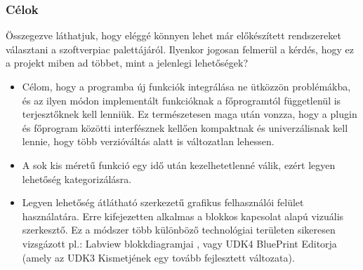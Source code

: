 \documentclass[a4paper,12pt,oneside]{report}
\begin{document}
\subsubsection{Célok}
Összegezve láthatjuk, hogy eléggé könnyen lehet már előkészített rendszereket választani a szoftverpiac palettájáról. Ilyenkor jogosan felmerül a kérdés, hogy ez a projekt miben ad többet, mint a jelenlegi lehetőségek? 
\begin{itemize}

\item Célom, hogy a programba új funkciók integrálása ne ütközzön problémákba, és az ilyen módon implementált funkcióknak a főprogramtól függetlenül is terjesztőknek kell lenniük. Ez természetesen maga után vonzza, hogy a plugin és főprogram közötti interfésznek kellően kompaktnak és univerzálisnak kell lennie, hogy több verzióváltás alatt is változatlan lehessen.

\item A sok kis méretű funkció egy idő után kezelhetetlenné válik, ezért legyen lehetőség kategorizálásra.

\item Legyen lehetőség átlátható szerkezetű grafikus felhasználói felület használatára. Erre kifejezetten alkalmas a blokkos kapcsolat alapú vizuális szerkesztő. Ez a módszer több különböző technológiai területen sikeresen vizsgázott pl.: Labview blokkdiagramjai \cite{website:ni_blocks}, vagy UDK4 BluePrint Editorja\cite{website:udk_blueprint} (amely az UDK3 Kismetjének egy tovább fejlesztett változata).
\end{itemize}
\end{document}
